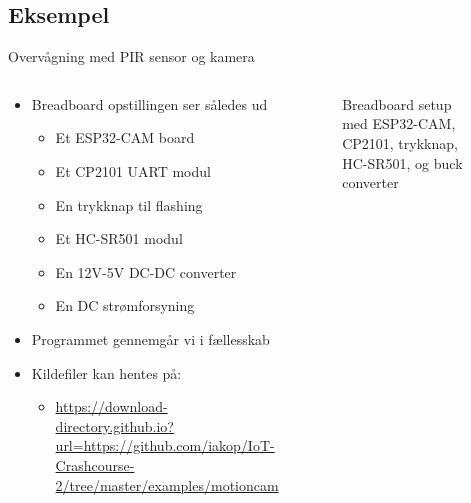\documentclass[aspectratio=169]{beamer}
\begin{document}
\subsection{Eksempel}
\begin{frame}{Overvågning med PIR sensor og kamera}
\begin{columns}
	\begin{column}{0.5\textwidth}
		\begin{textBox}
		\begin{itemize}
			\item Breadboard opstillingen ser således ud
			\begin{itemize}
				\item Et ESP32-CAM board
				\item Et CP2101 UART modul
				\item En trykknap til flashing
				\item Et HC-SR501 modul
				\item En 12V-5V DC-DC converter
				\item En DC strømforsyning
			\end{itemize}
			\item Programmet gennemgår vi i fællesskab
			\item Kildefiler kan hentes på:
			\begin{itemize}
				\item \tiny\url{https://download-directory.github.io?url=https://github.com/iakop/IoT-Crashcourse-2/tree/master/examples/motioncam}
			\end{itemize}
		\end{itemize}
		\end{textBox}
	\end{column}
	\begin{column}{0.5\textwidth}
		\centering
		\begin{figure}
  			
  			\caption{Breadboard setup med ESP32-CAM, CP2101, trykknap, HC-SR501, og buck converter}
  			\label{fig:motioncam}
		\end{figure}
	\end{column}
\end{columns}
\end{frame}
\end{document}
